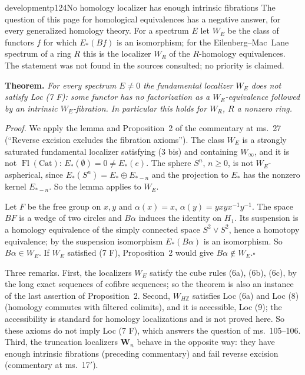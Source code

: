 \begin{dcomment}{development}{p124}{No homology localizer has enough intrinsic fibrations}
The question of this page for homological equivalences has a negative answer, for every generalized homology theory. For a spectrum $E$ let $W_E$ be the class of functors $f$ for which $E_*(Bf)$ is an isomorphism; for the Eilenberg--Mac~Lane spectrum of a ring $R$ this is the localizer $W_R$ of the $R$-homology equivalences. The statement was not found in the sources consulted; no priority is claimed.

\textbf{Theorem.}\ours
\textit{For every spectrum $E\neq0$ the fundamental localizer $W_E$ does not satisfy Loc (7 F): some functor has no factorization as a $W_E$-equivalence followed by an intrinsic $W_E$-fibration. In particular this holds for $W_R$, $R$ a nonzero ring.}

\textit{Proof.}
We apply the lemma and Proposition~2 of the commentary at ms.~27 (``Reverse excision excludes the fibration axioms''). The class $W_E$ is a strongly saturated fundamental localizer satisfying (3 bis) and containing $W_\infty$, and it is not $\operatorname{Fl}(\mathrm{Cat})$: $E_*(\emptyset)=0\neq E_*(e)$. The sphere $S^n$, $n\geq0$, is not $W_E$-aspherical, since $E_*(S^n)=E_*\oplus E_{*-n}$ and the projection to $E_*$ has the nonzero kernel $E_{*-n}$. So the lemma applies to $W_E$.

Let $F$ be the free group on $x,y$ and $\alpha(x)=x$, $\alpha(y)=yxyx^{-1}y^{-1}$. The space $BF$ is a wedge of two circles and $B\alpha$ induces the identity on $H_1$. Its suspension is a homology equivalence of the simply connected space $S^2\vee S^2$, hence a homotopy equivalence; by the suspension isomorphism $E_*(B\alpha)$ is an isomorphism. So $B\alpha\in W_E$. If $W_E$ satisfied (7 F), Proposition~2 would give $B\alpha\notin W_E$.\hfill$\square$

Three remarks. First, the localizers $W_E$ satisfy the cube rules (6a), (6b), (6c), by the long exact sequences of cofibre sequences; so the theorem is also an instance of the last assertion of Proposition~2. Second, $W_{H\mathbb Z}$ satisfies Loc (6a) and Loc (8) (homology commutes with filtered colimits), and it is accessible, Loc (9); the accessibility is standard for homology localizations and is not proved here. So these axioms do not imply Loc (7 F), which answers the question of ms.~105--106. Third, the truncation localizers $\mathbf W_n$ behave in the opposite way: they have enough intrinsic fibrations (preceding commentary) and fail reverse excision (commentary at ms.~17$'$).


\end{dcomment}
